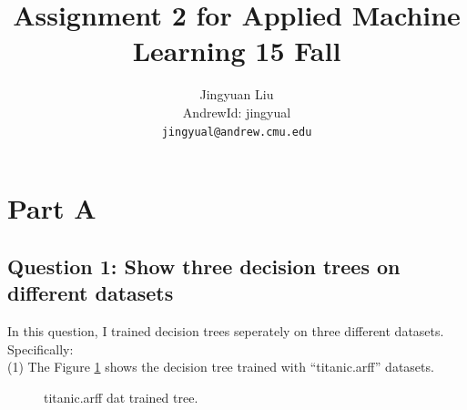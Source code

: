 \documentclass{article} %
\title{Assignment 2 for Applied Machine Learning 15 Fall}
\author{
Jingyuan Liu\\
AndrewId: jingyual\\
\texttt{jingyual@andrew.cmu.edu} \\
}
\begin{document}
\maketitle


\section{Part A}


\subsection{Question 1: Show three decision trees on different datasets}
In this question, I trained decision trees seperately on three different
datasets. Specifically:\\
(1) The Figure \ref{fig:titanic} shows the decision tree trained with
``titanic.arff'' datasets.
\begin{figure}[h]
\begin{center}
\end{center}
\caption{titanic.arff dat trained tree.}
\label{fig:titanic}
\end{figure}
\end{document}
